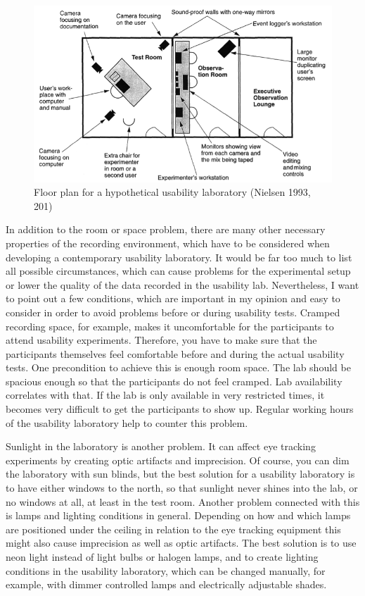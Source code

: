 \documentclass[output=paper]{langsci/langscibook}
\begin{document}
\begin{figure}[h]
 \includegraphics[width=\textwidth]{figures/Roesener6.png}
 \caption{Floor plan for a hypothetical usability laboratory (Nielsen 1993, 201)}
 \label{fig:6}
\end{figure} 


In addition to the room or space problem, there are many other necessary properties of the recording environment, which have to be considered when developing a contemporary usability laboratory. It would be far too much to list all possible circumstances, which can cause problems for the experimental setup or lower the quality of the data recorded in the usability lab. Nevertheless, I want to point out a few conditions, which are important in my opinion and easy to consider in order to avoid problems before or during usability tests. Cramped recording space, for example, makes it uncomfortable for the participants to attend usability experiments. Therefore, you have to make sure that the participants themselves feel comfortable before and during the actual usability tests. One precondition to achieve this is enough room space. The lab should be spacious enough so that the participants do not feel cramped. Lab availability correlates with that. If the lab is only available in very restricted times, it becomes very difficult to get the participants to show up. Regular working hours of the usability laboratory help to counter this problem.


 Sunlight in the laboratory is another problem. It can affect eye tracking experiments by creating optic artifacts and imprecision. Of course, you can dim the laboratory with sun blinds, but the best solution for a usability laboratory is to have either windows to the north, so that sunlight never shines into the lab, or no windows at all, at least in the test room. Another problem connected with this is lamps and lighting conditions in general. Depending on how and which lamps are positioned under the ceiling in relation to the eye tracking equipment this might also cause imprecision as well as optic artifacts. The best solution is to use neon light instead of light bulbs or halogen lamps, and to create lighting conditions in the usability laboratory, which can be changed manually, for example, with dimmer controlled lamps and electrically adjustable shades.
\end{document}
